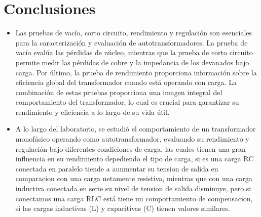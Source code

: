 \section*{Conclusiones}

\begin{itemize}
    \item Las pruebas de vacío, corto circuito, rendimiento y regulación son esenciales para la caracterización y evaluación de autotransformadores. La prueba de vacío evalúa las pérdidas de núcleo, mientras que la prueba de corto circuito permite medir las pérdidas de cobre y la impedancia de los devanados bajo carga. Por último, la prueba de rendimiento proporciona información sobre la eficiencia global del transformador cuando está operando con carga. La combinación de estas pruebas proporciona una imagen integral del comportamiento del transformador, lo cual es crucial para garantizar su rendimiento y eficiencia a lo largo de su vida útil.
    \item A lo largo del laboratorio, se estudió el comportamiento de un transformador monofásico operando como autotransformador, evaluando su rendimiento y regulación bajo diferentes condiciones de carga, las cuales tienen una gran influencia en su rendimiento depediendo el tipo de carga, si es una carga RC conectada en paralelo tiende a aunmentar su tension de salida en comparacion con una carga netamente resistiva, mientras que con una carga inductiva conectada en serie su nivel de tension de salida disminuye, pero si conectamos una carga RLC está tiene un comportamiento de compensacion, si las cargas inductivas (L) y capacitivas (C) tienen valores similares.
    \end{itemize}

